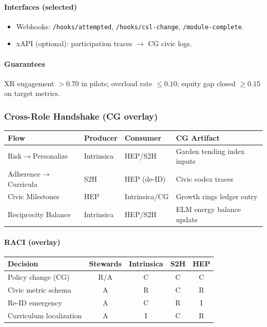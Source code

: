 \documentclass[11pt]{article}
\theoremstyle{plain}
\begin{document}
\paragraph{Interfaces (selected)}
\begin{itemize}
  \item Webhooks: \texttt{/hooks/attempted}, \texttt{/hooks/csl-change}, \texttt{/module-complete}.
  \item xAPI (optional): participation traces $\rightarrow$ CG civic logs.
\end{itemize}

\paragraph{Guarantees}
XR engagement $>0.70$ in pilots; overload rate $\le0.10$; equity gap closed $\ge0.15$ on target metrics.

\bigskip
\subsubsection*{Cross-Role Handshake (CG overlay)}
\begin{center}
\begin{tabular}{l l l l}
\hline
Flow & Producer & Consumer & CG Artifact \\
\hline
Risk$\rightarrow$Personalize & Intrinsica & HEP/S2H & Garden tending index inputs \\
Adherence$\rightarrow$Curricula & S2H & HEP (de-ID) & Civic codex traces \\
Civic Milestones & HEP & Intrinsica/CG & Growth rings ledger entry \\
Reciprocity Balance & Intrinsica & HEP/S2H & ELM energy balance update \\
\hline
\end{tabular}
\end{center}

\paragraph{RACI (overlay)}
\begin{center}
\begin{tabular}{l c c c c}
\hline
Decision & Stewards & Intrinsica & S2H & HEP \\
\hline
Policy change (CG) & R/A & C & C & C \\
Civic metric schema & A & R & C & R \\
Re-ID emergency & A & C & R & I \\
Curriculum localization & A & I & C & R \\
\hline
\end{tabular}
\end{center}
\end{document}
